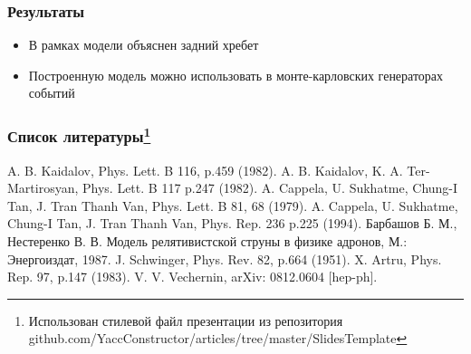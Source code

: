 \documentclass{beamer}
\begin{document}
\begin{frame}[fragile]
\begin{minipage}[h]{0.48\linewidth}
\begin{figure}
\end{figure}
\end{minipage}
\end{frame}

\begin{frame}[fragile]
\frametitle{Результаты}
\begin{itemize}
\item В рамках модели объяснен задний хребет
\item Построенную модель можно использовать в монте-карловских генераторах событий
\end{itemize}
\end{frame}

\begin{frame}[fragile]
\frametitle{Список литературы\footnote{Использован стилевой файл презентации из репозитория github.com/YaccConstructor/articles/tree/master/SlidesTemplate
}}
{\small
\begin{thebibliography}{00}
A. B. Kaidalov, Phys. Lett. B 116, p.459 (1982).
A. B. Kaidalov, K. A. Ter-Martirosyan, Phys. Lett. B 117 p.247 (1982).
A. Cappela, U. Sukhatme, Chung-I Tan, J. Tran Thanh Van, Phys. Lett. B 81, 68 (1979).
A. Cappela, U. Sukhatme, Chung-I Tan, J. Tran Thanh Van, Phys. Rep. 236 p.225 (1994).
Барбашов Б. М., Нестеренко В. В. Модель релятивистской струны в физике адронов, М.: Энергоиздат, 1987.
J. Schwinger, Phys. Rev. 82, p.664 (1951).
X. Artru, Phys. Rep. 97, p.147 (1983).
V. V. Vechernin, arXiv: 0812.0604 [hep-ph].
\end{thebibliography}
}
\end{frame}
\end{document}
